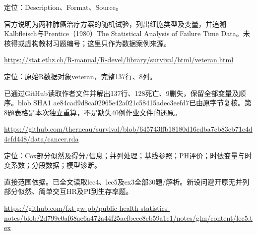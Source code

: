 \par\noindent\begin{minipage}{\linewidth}\raggedright{}\label{src:G4-VETERAN}
\par
定位：Description、Format、Source。\par
官方说明为两种肺癌治疗方案的随机试验，列出细胞类型及变量，并追溯Kalbfleisch与Prentice（1980）The Statistical Analysis of Failure Time Data。未核得或虚构教材习题编号；这里只作为数据案例来源。\par
{\small \url{https://stat.ethz.ch/R-manual/R-devel/library/survival/html/veteran.html}}\par
\end{minipage}\par\medskip

\par\noindent\begin{minipage}{\linewidth}\raggedright{}\label{src:G4-DATA}
\par
定位：原始R数据对象veteran，完整137行、8列。\par
已通过GitHub读取作者文件并解出137行、128死亡、9删失，保留全部变量及顺序。blob SHA1 ae84cad9d8ca02965e42a021c58415adec3eefd7已由原字节复核。第8题表格是本次独立重算，不是缺失40例作业文件的还原。\par
{\small \url{https://github.com/therneau/survival/blob/645743ffb18180d16cdba7cb83cb71c4d4cfd448/data/cancer.rda}}\par
\end{minipage}\par\medskip

\par\noindent\begin{minipage}{\linewidth}\raggedright{}\label{src:G5-NOTE}
\par
定位：Cox部分似然及得分/信息；并列处理；基线参照；PH评价；时依变量与时变系数；分段数据；模型诊断。\par
直接范围依据。已全文读取lec4、lec5及ex3全部30题/解析。新设问避开原无并列部分似然、简单交互HR及PI到生存率题。\par
{\small \url{https://github.com/fxt-gw-pb/public-health-statistics-notes/blob/2d799e0af68ae6a472a44f25aefbeec8cb59a1e1/notes/glm/content/lec5.tex}}\par
\end{minipage}\par\medskip

